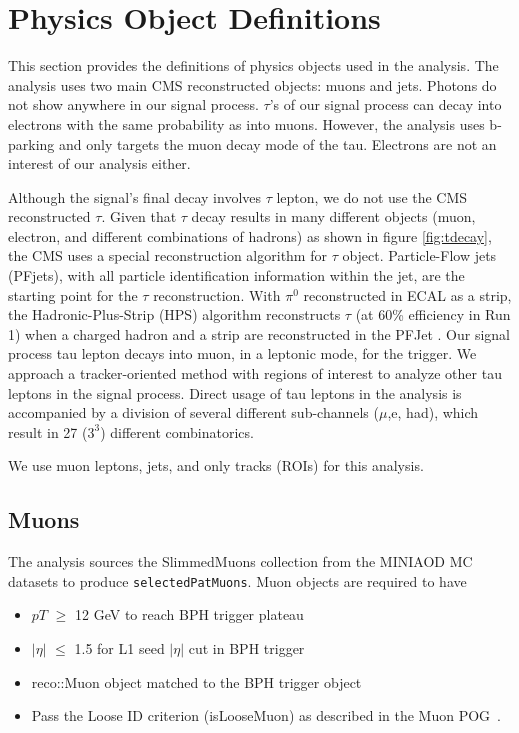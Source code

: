 \clearpage
\chapter{Physics Object Definitions}\label{sec:objects}

This section provides the definitions of physics objects used in the analysis.
The analysis uses two main CMS reconstructed objects: muons and jets.
Photons do not show anywhere in our signal process.
$\tau$'s of our signal process can decay into electrons with the same probability as into muons.
However, the analysis uses b-parking and only targets the muon decay mode of the tau.
Electrons are not an interest of our analysis either.

Although the signal's final decay involves $\tau$ lepton, we do not use the CMS reconstructed $\tau$.
Given that $\tau$ decay results in many different objects (muon, electron, and different combinations of hadrons) as shown in figure \ref{fig:tdecay}, the CMS uses a special reconstruction algorithm for $\tau$ object.
Particle-Flow jets (PFjets), with all particle identification information within the jet, are the starting point for the $\tau$ reconstruction.
With $\pi^{0}$ reconstructed in ECAL as a strip, the Hadronic-Plus-Strip (HPS) algorithm reconstructs $\tau$ (at 60\% efficiency in Run 1) when a charged hadron and a strip are reconstructed in the PFJet \cite{HPS}.
Our signal process tau lepton decays into muon, in a leptonic mode, for the trigger.
We approach a tracker-oriented method with regions of interest to analyze other tau leptons in the signal process.
Direct usage of tau leptons in the analysis is accompanied by a division of several different sub-channels ($\mu$,e, had), which result in 27 ($3^{3}$) different combinatorics.

We use muon leptons, jets, and only tracks (ROIs) for this analysis.
\section{Muons}\label{sec:muons}
The analysis sources the SlimmedMuons collection from the MINIAOD MC datasets to produce {\tt selectedPatMuons}.
Muon objects are required to have 
\begin{itemize}
  \item $pT$ $\geq$ 12 GeV to reach BPH trigger plateau
  \item $|\eta|$ $\leq$ 1.5 for L1 seed $|\eta|$ cut in BPH trigger
  \item reco::Muon object matched to the BPH trigger object
  \item Pass the Loose ID criterion (isLooseMuon) as described in the Muon POG~\cite{muonpog}.
\end{itemize}

